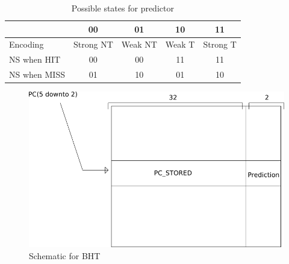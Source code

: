 \begin{table}[]
	\centering
	\begin{tabular}{l|cccc}
		\toprule
		& 00        & 01      & 10     & 11       \\
		\toprule
		Encoding     & Strong NT & Weak NT & Weak T & Strong T \\
		\midrule
		NS when HIT  & 00        & 00      & 11     & 11       \\
		NS when MISS & 01        & 10      & 01     & 10      	\\
		\bottomrule
	\end{tabular}
\caption{Possible states for predictor}
\label{pred_tab}
\end{table}


\begin{figure}
	\centering
	\includegraphics[scale=0.5]{chapters/figures/bht}
	\caption{Schematic for BHT}
	\label{bht_fig}
\end{figure}